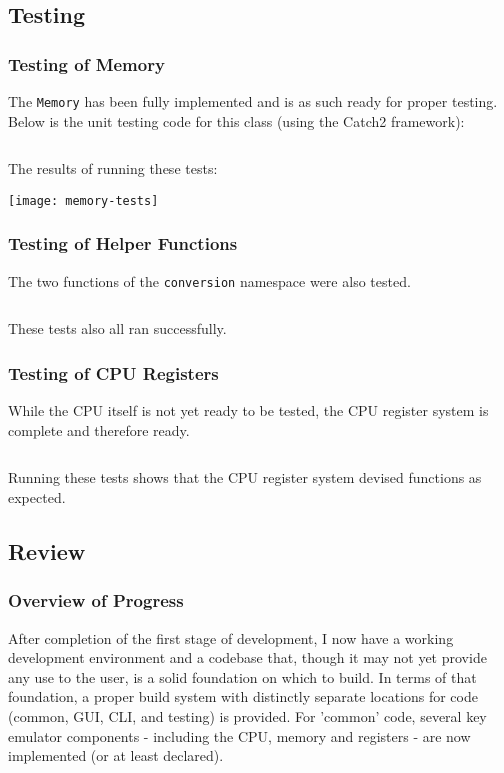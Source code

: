         \inputminted{c++}{code/initial/conversion.cpp}


\subsection{Testing}
    \subsubsection{Testing of Memory} \label{sec:initial-testing-memory}
        The \texttt{Memory} has been fully implemented and is as such ready for proper testing. Below is the unit testing code for this class (using the Catch2 framework):

        \inputminted{c++}{code/initial/testmemory.cpp}

        The results of running these tests:

        \texttt{[image: memory-tests]}

    \subsubsection{Testing of Helper Functions}
        The two functions of the \texttt{conversion} namespace were also tested.

        \inputminted{c++}{code/initial/testconversions.cpp}

        These tests also all ran successfully.

    \subsubsection{Testing of CPU Registers}
        While the CPU itself is not yet ready to be tested, the CPU register system is complete and therefore ready.

        \inputminted{c++}{code/initial/testregisters.cpp}

        Running these tests shows that the CPU register system devised functions as expected.

\subsection{Review}
    \subsubsection{Overview of Progress}
        After completion of the first stage of development, I now have a working development environment and a codebase that, though it may not yet provide any use to the user, is a solid foundation on which to build. In terms of that foundation, a proper build system with distinctly separate locations for code (common, GUI, CLI, and testing) is provided. For 'common' code, several key emulator components - including the CPU, memory and registers - are now implemented (or at least declared).

